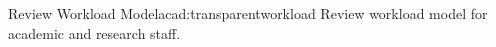 \newcommand{\actacadtransparentworkload}{%
Review workload model for academic and research staff.}
\begin{actionblock}{\ksspace{}Review Workload Model}{acad:transparentworkload}
\actacadtransparentworkload
\hfill{
    \hypersetup{hidelinks}
    \hyperlink{c19}{\gotoactionsymbol{}}
}
\end{actionblock}




